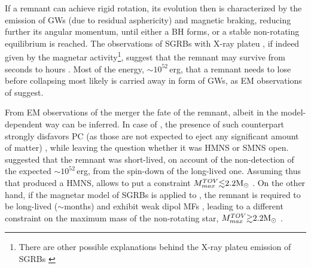 If a remnant can achieve rigid rotation, its evolution then is characterized by the emission 
of \acp{GW} (due to residual asphericity) and magnetic braking, reducing further its 
angular momentum, until either a \ac{BH} forms, or a stable non-rotating equilibrium is reached.
The observations of \acp{SGRB} with X-ray plateu 
\citep{Zhang:2000wx,Lasky:2015lej,Fan:2013cra}, if indeed given by the 
magnetar activity\footnote{
    There are other possible explanations behind the X-ray plateu emission of \acp{SGRB} 
    \citep{Oganesyan:2019jij}
}, suggest that the remnant may survive from seconds to hours \citep{Fan:2013cra,Ravi:2014gxa}.
Most of the energy, ${\sim}10^{52}\,$erg, that a remnant needs to lose before collapsing 
most likely is carried away in form of \acp{GW}, as \ac{EM} observations of \GW{} suggest.

From \ac{EM} observations of the merger the fate of the remnant, albeit in the 
model-dependent way can be inferred. In case of \GW{}, the presence of such counterpart 
strongly disfavors \ac{PC} (as those are not expected to eject any significant amount 
of matter) \citep{Margalit:2017dij,Bauswein:2017vtn,Radice:2017lry}, while leaving 
the question whether it was \ac{HMNS} or \ac{SMNS} open. \citet{Margalit:2017dij} suggested 
that the remnant was short-lived, on account of the non-detection of the expected ${\sim}10^{52}\,$erg, 
from the spin-down of the long-lived one. Assuming thus that \GW{} produced a \ac{HMNS}, 
allows to put a constraint $M_{max}^{TOV}{\lesssim}2.2{\text{M}_{\odot}}$ \citep{Margalit:2017dij}.
%
On the other hand, if the magnetar model of \acp{SGRB} is applied to \GW{} 
\citep{Ai:2018jtv,Li:2018hzy,Piro:2018bpl}, the remnant is required to be long-lived
(${\sim}$months) and exhibit weak dipol \acp{MF} \citep{Ai:2018jtv}, leading to a different 
constraint on the maximum mass of the non-rotating star, $M_{max}^{TOV}{\gtrsim}2.2{\text{M}_{\odot}}$ 
. 




